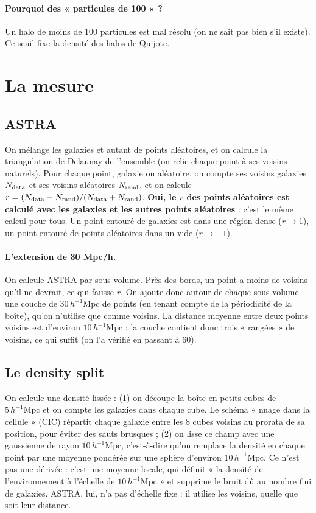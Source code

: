 \documentclass[11pt]{article}
\newcommand{\Mpch}{\,h^{-1}\mathrm{Mpc}}
\begin{document}
\paragraph{Pourquoi des « particules de 100 » ?} Un halo de moins de 100 particules est mal résolu (on ne sait pas bien s'il existe). Ce seuil fixe la densité des halos de Quijote.

\section{La mesure}

\subsection{ASTRA}
On mélange les galaxies et autant de points aléatoires, et on calcule la triangulation de Delaunay de l'ensemble (on relie chaque point à ses voisins naturels). Pour chaque point, galaxie ou aléatoire, on compte ses voisins galaxies $N_{\rm data}$ et ses voisins aléatoires $N_{\rm rand}$, et on calcule $r=(N_{\rm data}-N_{\rm rand})/(N_{\rm data}+N_{\rm rand})$. \textbf{Oui, le $r$ des points aléatoires est calculé avec les galaxies et les autres points aléatoires} : c'est le même calcul pour tous. Un point entouré de galaxies est dans une région dense ($r\to1$), un point entouré de points aléatoires dans un vide ($r\to-1$).

\paragraph{L'extension de 30 Mpc/h.} On calcule ASTRA par sous-volume. Près des bords, un point a moins de voisins qu'il ne devrait, ce qui fausse $r$. On ajoute donc autour de chaque sous-volume une couche de $30\Mpch$ de points (en tenant compte de la périodicité de la boîte), qu'on n'utilise que comme voisins. La distance moyenne entre deux points voisins est d'environ $10\Mpch$ : la couche contient donc trois « rangées » de voisins, ce qui suffit (on l'a vérifié en passant à 60).

\subsection{Le density split}
On calcule une densité lissée : (1) on découpe la boîte en petits cubes de $5\Mpch$ et on compte les galaxies dans chaque cube. Le schéma « nuage dans la cellule » (CIC) répartit chaque galaxie entre les 8 cubes voisins au prorata de sa position, pour éviter des sauts brusques ; (2) on lisse ce champ avec une gaussienne de rayon $10\Mpch$, c'est-à-dire qu'on remplace la densité en chaque point par une moyenne pondérée sur une sphère d'environ $10\Mpch$. Ce n'est pas une dérivée : c'est une moyenne locale, qui définit « la densité de l'environnement à l'échelle de $10\Mpch$ » et supprime le bruit dû au nombre fini de galaxies. ASTRA, lui, n'a pas d'échelle fixe : il utilise les voisins, quelle que soit leur distance.
\end{document}
